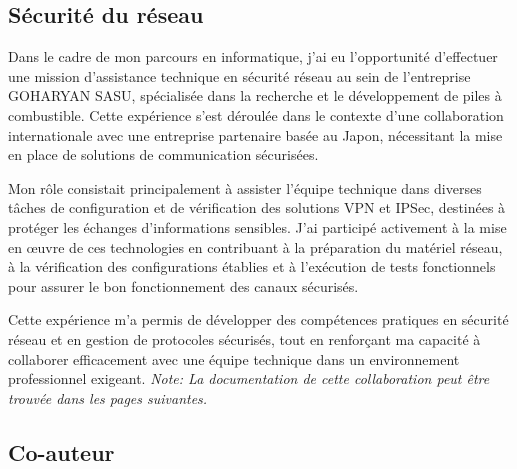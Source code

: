 \documentclass{article}
\begin{document}
    \subsection{Sécurité du réseau}

    Dans le cadre de mon parcours en informatique, j'ai eu l'opportunité d'effectuer une mission d'assistance technique en sécurité réseau au sein de l'entreprise GOHARYAN SASU, spécialisée dans la recherche et le développement de piles à combustible. Cette expérience s'est déroulée dans le contexte d'une collaboration internationale avec une entreprise partenaire basée au Japon, nécessitant la mise en place de solutions de communication sécurisées.

Mon rôle consistait principalement à assister l’équipe technique dans diverses tâches de configuration et de vérification des solutions VPN et IPSec, destinées à protéger les échanges d’informations sensibles. J'ai participé activement à la mise en œuvre de ces technologies en contribuant à la préparation du matériel réseau, à la vérification des configurations établies et à l’exécution de tests fonctionnels pour assurer le bon fonctionnement des canaux sécurisés.

Cette expérience m'a permis de développer des compétences pratiques en sécurité réseau et en gestion de protocoles sécurisés, tout en renforçant ma capacité à collaborer efficacement avec une équipe technique dans un environnement professionnel exigeant.
    \newline
    \newline
    \textit {Note: La documentation de cette collaboration peut être trouvée dans les pages suivantes.}
    \newline
    \newline

    \newpage

        \begin{center}
            \footnotesize
        \end{center}
    


    \subsection{Co-auteur}
\end{document}
